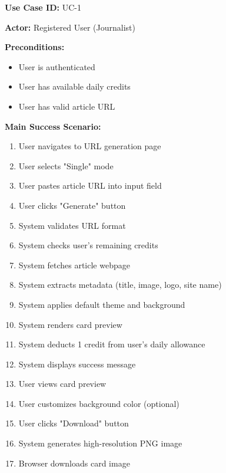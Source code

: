 \documentclass[12pt,a4paper]{article}
\begin{document}
\textbf{Use Case ID:} UC-1

\textbf{Actor:} Registered User (Journalist)

\textbf{Preconditions:}
\begin{itemize}
    \item User is authenticated
    \item User has available daily credits
    \item User has valid article URL
\end{itemize}

\textbf{Main Success Scenario:}
\begin{enumerate}
    \item User navigates to URL generation page
    \item User selects "Single" mode
    \item User pastes article URL into input field
    \item User clicks "Generate" button
    \item System validates URL format
    \item System checks user's remaining credits
    \item System fetches article webpage
    \item System extracts metadata (title, image, logo, site name)
    \item System applies default theme and background
    \item System renders card preview
    \item System deducts 1 credit from user's daily allowance
    \item System displays success message
    \item User views card preview
    \item User customizes background color (optional)
    \item User clicks "Download" button
    \item System generates high-resolution PNG image
    \item Browser downloads card image
\end{enumerate}
\end{document}
